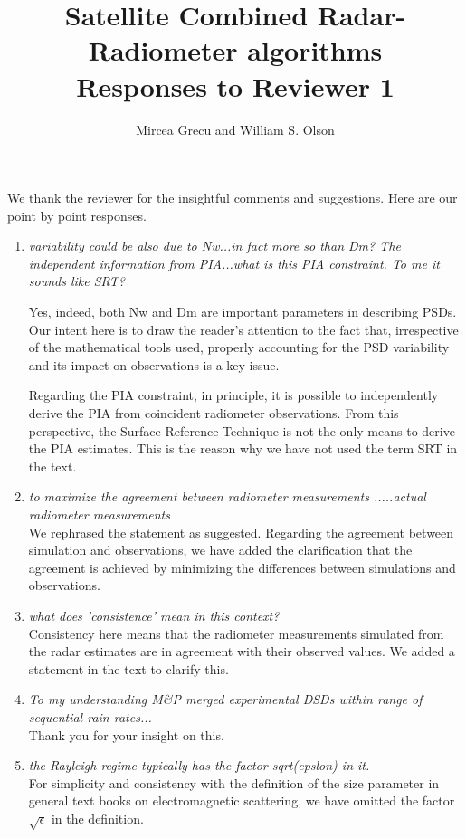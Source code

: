 \documentclass[12pt]{article}
\author{Mircea Grecu and William S. Olson}
\title{Satellite Combined Radar-Radiometer
algorithms\\
Responses to Reviewer 1}
\date{}
\begin{document}
\maketitle


We thank the reviewer for the insightful comments and suggestions. 
Here are our point by point responses.

\begin{enumerate}
\item	{\textit{variability could be also due to Nw...in fact more so than Dm? The independent information from PIA...what is this PIA constraint. 
To me it sounds like SRT?}

Yes, indeed, both Nw and Dm are important parameters in describing PSDs. Our intent here is to draw the reader's attention to the
fact that, irrespective of the mathematical tools used, properly accounting for the PSD variability and its impact on observations
is a key issue. 

Regarding the PIA constraint, in principle, it is possible to independently derive the PIA from coincident radiometer observations.
From this perspective, the Surface Reference Technique is not the only means to derive the PIA estimates.  This is the reason why
we have not used the term SRT in the text.}

\item {\textit{to maximize the agreement between radiometer 
measurements .....actual radiometer measurements}\\
We rephrased the statement as suggested.  Regarding the agreement between simulation and observations, we have added the clarification
that the agreement is achieved by minimizing the differences between simulations and observations.}

\item {\textit{what does 'consistence' mean in this context?}\\
Consistency here means that the radiometer measurements simulated from the radar estimates are in agreement with their observed values. We added a statement in 
the text to clarify this.}

\item{\textit{To my understanding M\&P merged experimental DSDs within range of sequential rain rates...}\\
Thank you for your insight on this.
}

\item{\textit{the Rayleigh regime typically has the factor sqrt(epslon) in it.}\\
For simplicity and consistency with the definition of the size parameter in general text books on electromagnetic scattering, we have
omitted the factor $\sqrt{\epsilon}$ in the definition.}


\end{enumerate}
\end{document}
